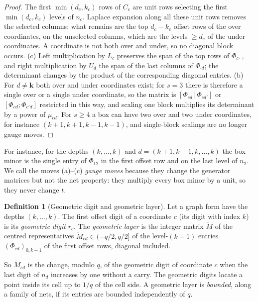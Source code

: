 \documentclass[11pt]{amsart}
\theoremstyle{definition}
\newtheorem{definition}[theorem]{Definition}
\theoremstyle{plain}
\begin{document}
\begin{proof}
The first $\min(d_c,k_c)$ rows of $C_c$ are unit rows selecting the first $\min(d_c,k_c)$ levels of $n_c$. Laplace expansion along all these unit rows removes the selected columns; what remains are the top $d_c-k_c$ offset rows of the over coordinates, on the unselected columns, which are the levels $\ge d_e$ of the under coordinates. A coordinate is not both over and under, so no diagonal block occurs. (c) Left multiplication by $L_c$ preserves the span of the top rows of $\Phi_{c\cdot}$, and right multiplication by $U_d$ the span of the last columns of $\Phi_{\cdot d}$; the determinant changes by the product of the corresponding diagonal entries. (b) For $d\ne \mathbf k$ both over and under coordinates exist; for $s=3$ there is therefore a single over or a single under coordinate, so the matrix is $[\Phi_{cd}\,|\,\Phi_{cd'}]$ or $[\Phi_{cd};\Phi_{c'd}]$ restricted in this way, and scaling one block multiplies its determinant by a power of $\mu_{cd}$. For $s\ge4$ a box can have two over and two under coordinates, for instance $(k+1,k+1,k-1,k-1)$, and single-block scalings are no longer gauge moves.
\end{proof}

For instance, for the depths $(k,\dots,k)$ and $d=(k+1,k-1,k,\dots,k)$ the box minor is the single entry of $\Phi_{12}$ in the first offset row and on the last level of $n_2$. We call the moves (a)--(c) \emph{gauge moves} because they change the generator matrices but not the net property: they multiply every box minor by a unit, so they never change $t$.

\begin{definition}[Geometric digit and geometric layer]\label{def:geom}
Let a graph form have the depths $(k,\dots,k)$. The first offset digit of a coordinate $c$ (its digit with index $k$) is its \emph{geometric digit} $r_c$. The \emph{geometric layer} is the integer matrix $\tilde M$ of the centred representatives $\tilde M_{cd}\in(-q/2,q/2]$ of the level-$(k-1)$ entries $(\Phi_{cd})_{0,k-1}$ of the first offset rows, diagonal included.
\end{definition}

So $\tilde M_{cd}$ is the change, modulo $q$, of the geometric digit of coordinate $c$ when the last digit of $n_d$ increases by one without a carry. The geometric digits locate a point inside its cell up to $1/q$ of the cell side. A geometric layer is \emph{bounded}, along a family of nets, if its entries are bounded independently of $q$.
\end{document}
